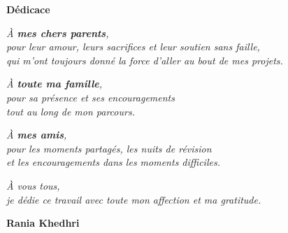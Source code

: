 \thispagestyle{plain}
\begin{center}
\textbf{\Huge Dédicace}
\end{center}


\vspace{1.5cm}

\begin{center}
\textit{
À \textbf{mes chers parents},\\
pour leur amour, leurs sacrifices et leur soutien sans faille,\\
qui m'ont toujours donné la force d'aller au bout de mes projets.
}
\end{center}

\vspace{0.8cm}

\begin{center}
\textit{
À \textbf{toute ma famille},\\
pour sa présence et ses encouragements\\
tout au long de mon parcours.
}
\end{center}

\vspace{0.8cm}

\begin{center}
\textit{
À \textbf{mes amis},\\
pour les moments partagés, les nuits de révision\\
et les encouragements dans les moments difficiles.
}
\end{center}

\vspace{0.8cm}

\begin{center}
\textit{
À vous tous,\\
je dédie ce travail avec toute mon affection et ma gratitude.
}
\end{center}
\begin{center}
\raggedleft\textbf{Rania Khedhri}
\end{center}
